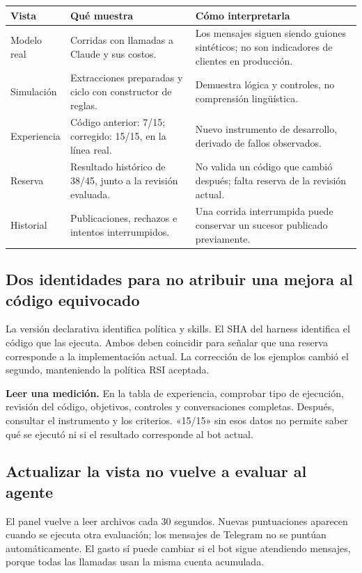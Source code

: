 \documentclass[11pt,a4paper]{article}
\begin{document}
\begin{tabularx}{\linewidth}{@{}P{36mm}YY@{}}
\toprule
\textbf{Vista} & \textbf{Qué muestra} & \textbf{Cómo interpretarla}\\
\midrule
Modelo real & Corridas con llamadas a Claude y sus costos. & Los mensajes siguen siendo guiones sintéticos; no son indicadores de clientes en producción.\\
Simulación & Extracciones preparadas y ciclo con constructor de reglas. & Demuestra lógica y controles, no comprensión lingüística.\\
Experiencia & Código anterior: 7/15; corregido: 15/15, en la línea real. & Nuevo instrumento de desarrollo, derivado de fallos observados.\\
Reserva & Resultado histórico de 38/45, junto a la revisión evaluada. & No valida un código que cambió después; falta reserva de la revisión actual.\\
Historial & Publicaciones, rechazos e intentos interrumpidos. & Una corrida interrumpida puede conservar un sucesor publicado previamente.\\
\bottomrule
\end{tabularx}

\subsection{Dos identidades para no atribuir una mejora al código equivocado}
La versión declarativa identifica política y skills. El SHA del harness identifica
el código que las ejecuta. Ambos deben coincidir para señalar que una reserva
corresponde a la implementación actual. La corrección de los ejemplos cambió el
segundo, manteniendo la política RSI aceptada.

\begin{nota}
\textbf{Leer una medición.} En la tabla de experiencia, comprobar tipo de ejecución,
revisión del código, objetivos, controles y conversaciones completas. Después,
consultar el instrumento y los criterios. «15/15» sin esos datos no permite saber
qué se ejecutó ni si el resultado corresponde al bot actual.
\end{nota}

\subsection{Actualizar la vista no vuelve a evaluar al agente}
El panel vuelve a leer archivos cada 30 segundos. Nuevas puntuaciones aparecen
cuando se ejecuta otra evaluación; los mensajes de Telegram no se puntúan
automáticamente. El gasto sí puede cambiar si el bot sigue atendiendo mensajes,
porque todas las llamadas usan la misma cuenta acumulada.
\end{document}
